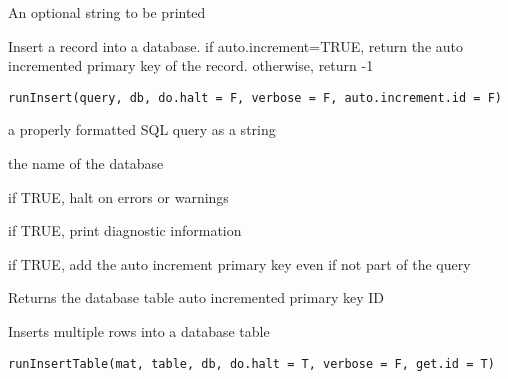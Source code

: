 \documentclass[letterpaper]{book}
\begin{document}
%
\begin{Arguments}
\begin{ldescription}
\item[\code{comment.string}] An optional string to be printed
\end{ldescription}
\end{Arguments}
%
\begin{Description}\relax
Insert a record into a database. if auto.increment=TRUE, return the auto incremented
primary key of the record. otherwise, return -1
\end{Description}
%
\begin{Usage}
\begin{verbatim}
runInsert(query, db, do.halt = F, verbose = F, auto.increment.id = F)
\end{verbatim}
\end{Usage}
%
\begin{Arguments}
\begin{ldescription}
\item[\code{query}] a properly formatted SQL query as a string

\item[\code{db}] the name of the database

\item[\code{do.halt}] if TRUE, halt on errors or warnings

\item[\code{verbose}] if TRUE, print diagnostic information

\item[\code{auto.increment}] if TRUE, add the auto increment primary key even if not part of the query
\end{ldescription}
\end{Arguments}
%
\begin{Value}
Returns the database table auto incremented primary key ID
\end{Value}
%
\begin{Description}\relax
Inserts multiple rows into a database table
\end{Description}
%
\begin{Usage}
\begin{verbatim}
runInsertTable(mat, table, db, do.halt = T, verbose = F, get.id = T)
\end{verbatim}
\end{Usage}
\end{document}
